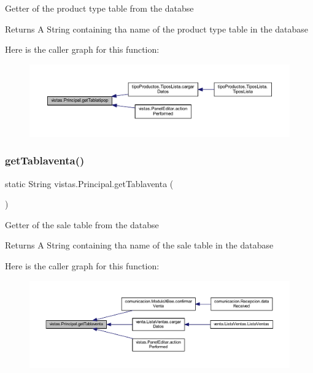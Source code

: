 Getter of the product type table from the databse \begin{DoxyReturn}{Returns}
A String containing tha name of the product type table in the database 
\end{DoxyReturn}
Here is the caller graph for this function\+:
\nopagebreak
\begin{figure}[H]
\begin{center}
\leavevmode
\includegraphics[width=350pt]{classvistas_1_1_principal_a3cf8de4e71a59fc279da130e39af6cd2_icgraph}
\end{center}
\end{figure}
\mbox{\label{classvistas_1_1_principal_aa81de202b442c060c9db8f564ba288b3}} 
\subsubsection{\texorpdfstring{get\+Tablaventa()}{getTablaventa()}}
{\footnotesize\ttfamily static String vistas.\+Principal.\+get\+Tablaventa (\begin{DoxyParamCaption}{ }\end{DoxyParamCaption})\hspace{0.3cm}{\ttfamily [static]}}

Getter of the sale table from the databse \begin{DoxyReturn}{Returns}
A String containing tha name of the sale table in the database 
\end{DoxyReturn}
Here is the caller graph for this function\+:
\nopagebreak
\begin{figure}[H]
\begin{center}
\leavevmode
\includegraphics[width=350pt]{classvistas_1_1_principal_aa81de202b442c060c9db8f564ba288b3_icgraph}
\end{center}
\end{figure}
\mbox{\label{classvistas_1_1_principal_ae8d4c8bb777f2af665a09be522ab1d81}} 
